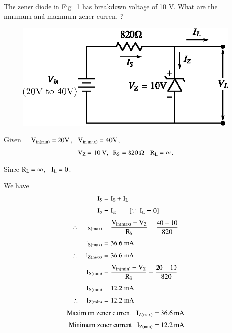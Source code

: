 \begin{problem}\label{prob1.28}
The zener diode in Fig.~\ref{fig1.47} has breakdown voltage of 10 V. What are the minimum and maximum zener current ?
\begin{figure}[H]
\centering
\includegraphics{chap1/fig1.47.eps}
\caption{}\label{fig1.47}
\end{figure}
\end{problem}

\begin{solution}
Given~~ $\textrm{V}_{\text{in}(\min)}=20\textrm{V}$, \ $\textrm{V}_{\text{in}(\max)}=40\textrm{V}$,
$$
\rmV_{\rmZ}=10\text{~V}, \ \ \rmR_{\rmS}=820\,\Omega, \ \ \rmR_{\rmL}=\infty.
$$

Since $\textrm{R}_{\textrm{L}}=\infty$, \ $\textrm{I}_{\textrm{L}}=0$.

\eject

We have
\begin{align*}
\textrm{I}_{\textrm{S}} &= \textrm{I}_{\textrm{S}}+\textrm{I}_{\textrm{L}}\\[3pt]
\textrm{I}_{\textrm{S}} &= \textrm{I}_{\textrm{Z}}\qquad [\because \ \textrm{I}_{\textrm{L}}=0]\\[3pt]
\therefore\quad \textrm{I}_{\textrm{S}(\max)} &= \frac{\textrm{V}_{\text{in}(\max)}-\textrm{V}_{\textrm{Z}}}{\textrm{R}_{\textrm{S}}}= \frac{40-10}{820}\\[3pt]
\textrm{I}_{\textrm{S}(\max)} &= 36.6\text{~mA}\\[3pt]
\therefore\quad \textrm{I}_{\textrm{Z}(\max)} &= 36.6\text{~mA}\\[3pt]
\textrm{I}_{\textrm{S}(\min)} &= \frac{\textrm{V}_{\text{in}(\min)}-\textrm{V}_{\textrm{Z}}}{\textrm{R}_{\textrm{S}}}
= \frac{20-10}{820}\\[3pt]
\textrm{I}_{\textrm{S}(\min)} &= 12.2\text{~mA}\\[3pt]
\therefore\quad \textrm{I}_{\textrm{Z}(\min)} &= 12.2\text{~mA}
\end{align*}
\begin{align*}
\text{Maximum zener current~~ } \textrm{I}_{\textrm{Z}(\max)} &= 36.6\text{~mA}\\[3pt]
\text{Minimum zener current~~ } \textrm{I}_{\textrm{Z}(\min)} &= 12.2\text{~mA}
\end{align*}
\end{solution}

